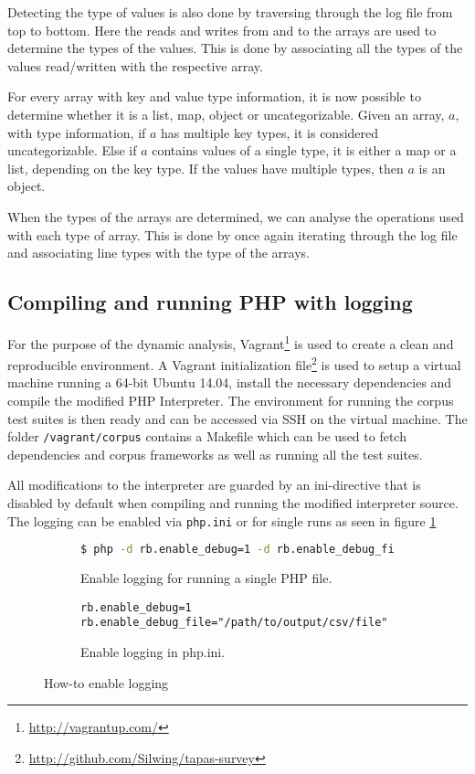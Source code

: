 Detecting the type of values is also done by traversing through the log file from top to bottom. Here the reads and writes from and to the arrays are used to determine the types of the values. This is done by associating all the types of the values read/written with the respective array. 

For every array with key and value type information, it is now possible to determine whether it is a list, map, object or uncategorizable. Given an array, $a$, with type information, if $a$ has multiple key types, it is considered uncategorizable. Else if $a$ contains values of a single type, it is either a map or a list, depending on the key type. If the values have multiple types, then $a$ is an object.

When the types of the arrays are determined, we can analyse the operations used with each type of array. This is done by once again iterating through the log file and associating line types with the type of the arrays.

\subsection{Compiling and running PHP with logging}
For the purpose of the dynamic analysis, Vagrant\footnote{\url{http://vagrantup.com/}} is used to create a clean and reproducible environment. A Vagrant initialization file\footnote{\url{http://github.com/Silwing/tapas-survey}} is used to setup a virtual machine running a 64-bit Ubuntu 14.04, install the necessary dependencies and compile the modified PHP Interpreter. The environment for running the corpus test suites is then ready and can be accessed via SSH on the virtual machine. The folder \texttt{/vagrant/corpus} contains a Makefile which can be used to fetch dependencies and corpus frameworks as well as running all the test suites.

All modifications to the interpreter are guarded by an ini-directive that is disabled by default when compiling and running the modified interpreter source. The logging can be enabled via \texttt{php.ini} or for single runs as seen in figure \ref{fig:iniDirective}

\begin{figure}[ht]
\centering
\begin{subfigure}{\linewidth}
\begin{lstlisting}[language=bash]
$ php -d rb.enable_debug=1 -d rb.enable_debug_file=<path-to-log-file> <path-to-php-file>
\end{lstlisting}
\caption{Enable logging for running a single PHP file.}
\end{subfigure}
\begin{subfigure}{\linewidth}
\begin{lstlisting}
rb.enable_debug=1
rb.enable_debug_file="/path/to/output/csv/file"
\end{lstlisting}
\caption{Enable logging in php.ini.}
\end{subfigure}
\caption{How-to enable logging}
\label{fig:iniDirective}
\end{figure}

